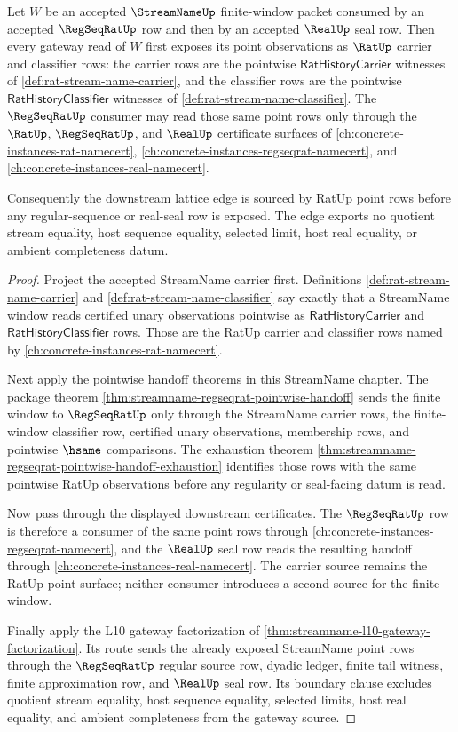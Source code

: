 \begin{theorem}
\label{thm:streamname-rat-regseqrat-lattice-source}
Let $W$ be an accepted $\StreamNameUp$ finite-window packet consumed by an accepted $\RegSeqRatUp$ row and then by an accepted $\RealUp$ seal row. Then every gateway read of $W$ first exposes its point observations as $\RatUp$ carrier and classifier rows: the carrier rows are the pointwise $\mathsf{RatHistoryCarrier}$ witnesses of \autoref{def:rat-stream-name-carrier}, and the classifier rows are the pointwise $\mathsf{RatHistoryClassifier}$ witnesses of \autoref{def:rat-stream-name-classifier}. The $\RegSeqRatUp$ consumer may read those same point rows only through the $\RatUp$, $\RegSeqRatUp$, and $\RealUp$ certificate surfaces of \autoref{ch:concrete-instances-rat-namecert}, \autoref{ch:concrete-instances-regseqrat-namecert}, and \autoref{ch:concrete-instances-real-namecert}.

Consequently the downstream lattice edge is sourced by RatUp point rows before any regular-sequence or real-seal row is exposed. The edge exports no quotient stream equality, host sequence equality, selected limit, host real equality, or ambient completeness datum.
\end{theorem}
\begin{proof}
Project the accepted StreamName carrier first. Definitions \autoref{def:rat-stream-name-carrier} and \autoref{def:rat-stream-name-classifier} say exactly that a StreamName window reads certified unary observations pointwise as $\mathsf{RatHistoryCarrier}$ and $\mathsf{RatHistoryClassifier}$ rows. Those are the RatUp carrier and classifier rows named by \autoref{ch:concrete-instances-rat-namecert}.

Next apply the pointwise handoff theorems in this StreamName chapter. The package theorem \autoref{thm:streamname-regseqrat-pointwise-handoff} sends the finite window to $\RegSeqRatUp$ only through the StreamName carrier rows, the finite-window classifier row, certified unary observations, membership rows, and pointwise $\hsame$ comparisons. The exhaustion theorem \autoref{thm:streamname-regseqrat-pointwise-handoff-exhaustion} identifies those rows with the same pointwise RatUp observations before any regularity or seal-facing datum is read.

Now pass through the displayed downstream certificates. The $\RegSeqRatUp$ row is therefore a consumer of the same point rows through \autoref{ch:concrete-instances-regseqrat-namecert}, and the $\RealUp$ seal row reads the resulting handoff through \autoref{ch:concrete-instances-real-namecert}. The carrier source remains the RatUp point surface; neither consumer introduces a second source for the finite window.

Finally apply the L10 gateway factorization of \autoref{thm:streamname-l10-gateway-factorization}. Its route sends the already exposed StreamName point rows through the $\RegSeqRatUp$ regular source row, dyadic ledger, finite tail witness, finite approximation row, and $\RealUp$ seal row. Its boundary clause excludes quotient stream equality, host sequence equality, selected limits, host real equality, and ambient completeness from the gateway source.
\end{proof}

